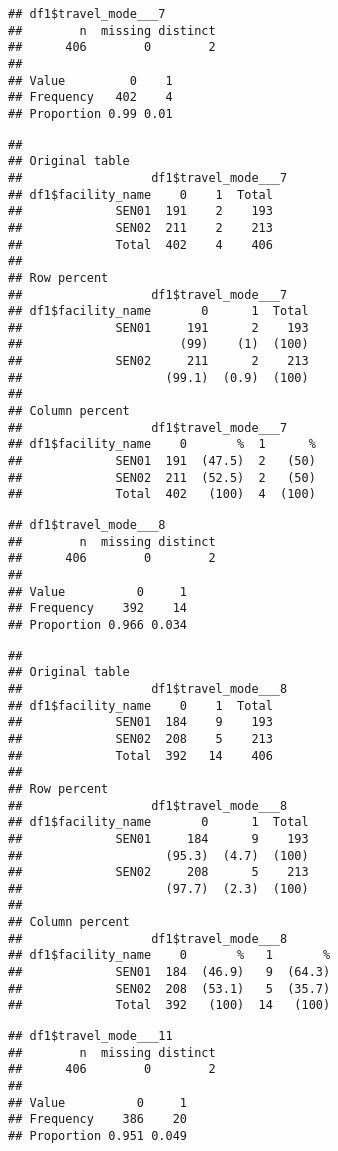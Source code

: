 \documentclass[
]{article}
\begin{document}
\begin{verbatim}
## df1$travel_mode___7 
##        n  missing distinct 
##      406        0        2 
##                     
## Value         0    1
## Frequency   402    4
## Proportion 0.99 0.01
\end{verbatim}

\begin{verbatim}
## 
## Original table 
##                  df1$travel_mode___7
## df1$facility_name    0    1  Total
##             SEN01  191    2    193
##             SEN02  211    2    213
##             Total  402    4    406
## 
## Row percent 
##                  df1$travel_mode___7
## df1$facility_name       0      1  Total
##             SEN01     191      2    193
##                      (99)    (1)  (100)
##             SEN02     211      2    213
##                    (99.1)  (0.9)  (100)
## 
## Column percent 
##                  df1$travel_mode___7
## df1$facility_name    0       %  1      %
##             SEN01  191  (47.5)  2   (50)
##             SEN02  211  (52.5)  2   (50)
##             Total  402   (100)  4  (100)
\end{verbatim}

\begin{verbatim}
## df1$travel_mode___8 
##        n  missing distinct 
##      406        0        2 
##                       
## Value          0     1
## Frequency    392    14
## Proportion 0.966 0.034
\end{verbatim}

\begin{verbatim}
## 
## Original table 
##                  df1$travel_mode___8
## df1$facility_name    0    1  Total
##             SEN01  184    9    193
##             SEN02  208    5    213
##             Total  392   14    406
## 
## Row percent 
##                  df1$travel_mode___8
## df1$facility_name       0      1  Total
##             SEN01     184      9    193
##                    (95.3)  (4.7)  (100)
##             SEN02     208      5    213
##                    (97.7)  (2.3)  (100)
## 
## Column percent 
##                  df1$travel_mode___8
## df1$facility_name    0       %   1       %
##             SEN01  184  (46.9)   9  (64.3)
##             SEN02  208  (53.1)   5  (35.7)
##             Total  392   (100)  14   (100)
\end{verbatim}

\begin{verbatim}
## df1$travel_mode___11 
##        n  missing distinct 
##      406        0        2 
##                       
## Value          0     1
## Frequency    386    20
## Proportion 0.951 0.049
\end{verbatim}
\end{document}
